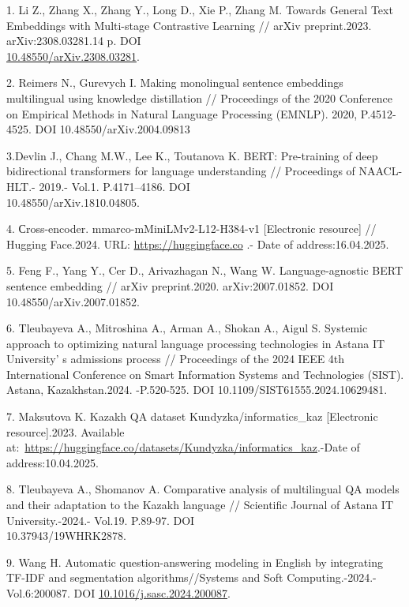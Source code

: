 \begin{refs}
1. Li Z., Zhang X., Zhang Y., Long D., Xie P., Zhang M. Towards General
Text Embeddings with Multi-stage Contrastive Learning // arXiv
preprint.2023. arXiv:2308.03281.14 p. DOI\\
\href{https://doi.org/10.48550/arXiv.2308.03281}{10.48550/arXiv.2308.03281}.

2. Reimers N., Gurevych I. Making monolingual sentence embeddings
multilingual using knowledge distillation // Proceedings of the 2020
Conference on Empirical Methods in Natural Language Processing (EMNLP).
2020, P.4512-4525. DOI 10.48550/arXiv.2004.09813

3.Devlin J., Chang M.W., Lee K., Toutanova K. BERT: Pre-training of
deep bidirectional transformers for language understanding //
Proceedings of NAACL-HLT.- 2019.- Vol.1. P.4171--4186. DOI\\
10.48550/arXiv.1810.04805.

4. Сross-encoder. mmarco-mMiniLMv2-L12-H384-v1 {[}Electronic resource{]}
// Hugging Face.2024.
URL: \href{https://huggingface.co/cross-encoder/mmarco-mMiniLMv2-L12-H384-v1}{https://huggingface.co} .-
Date of address:16.04.2025.

5. Feng F., Yang Y., Cer D., Arivazhagan N., Wang W. Language-agnostic
BERT sentence embedding // arXiv preprint.2020. arXiv:2007.01852. DOI
10.48550/arXiv.2007.01852.

6. Tleubayeva A., Mitroshina A., Arman A., Shokan A., Aigul S. Systemic
approach to optimizing natural language processing technologies in
Astana IT University' s admissions process // Proceedings
of the 2024 IEEE 4th International Conference on Smart Information
Systems and Technologies (SIST). Astana, Kazakhstan.2024. -P.520-525.
DOI 10.1109/SIST61555.2024.10629481.

7. Maksutova K. Kazakh QA dataset Kundyzka/informatics\_kaz
{[}Electronic resource{]}.2023. Available
at:~\url{https://huggingface.co/datasets/Kundyzka/informatics_kaz}.-Date
of address:10.04.2025.

8. Tleubayeva A., Shomanov A. Comparative analysis of multilingual QA
models and their adaptation to the Kazakh language // Scientific Journal
of Astana IT University.-2024.- Vol.19. P.89-97. DOI\\
10.37943/19WHRK2878.

9. Wang H. Automatic question-answering modeling in English by
integrating TF-IDF and segmentation algorithms//Systems and Soft
Computing.-2024.-Vol.6:200087. DOI
\href{https://doi.org/10.1016/j.sasc.2024.200087}{10.1016/j.sasc.2024.200087}.


\end{refs}
